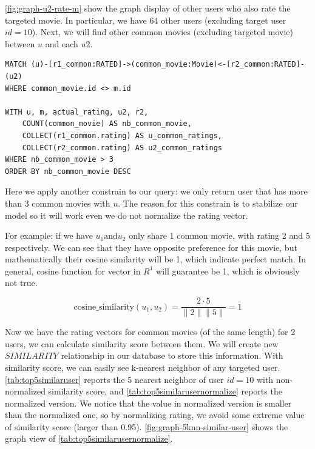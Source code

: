 \documentclass{article}
\begin{document}
\autoref{fig:graph-u2-rate-m} show the graph display of other users who also rate the targeted movie. In particular, we have 64 other users (excluding target user $id=10$). Next, we will find other common movies (excluding targeted movie) between $u$ and each $u2$. 

\begin{verbatim}
MATCH (u)-[r1_common:RATED]->(common_movie:Movie)<-[r2_common:RATED]-(u2)
WHERE common_movie.id <> m.id

WITH u, m, actual_rating, u2, r2,
    COUNT(common_movie) AS nb_common_movie, 
    COLLECT(r1_common.rating) AS u_common_ratings,
    COLLECT(r2_common.rating) AS u2_common_ratings
WHERE nb_common_movie > 3
ORDER BY nb_common_movie DESC
\end{verbatim}

Here we apply another constrain to our query: we only return user that has more than 3 common movies with $u$. The reason for this constrain is to stabilize our model so it will work even we do not normalize the rating vector. 

For example: if we have \(u_1 \text{and} u_2\) only share 1 common movie, with rating 2 and 5 respectively. We can see that they have opposite preference for this movie, but mathematically their cosine similarity will be 1, which indicate perfect match. In general, cosine function for vector in \(R^1\) will guarantee be 1, which is obviously not true.   

\[
\text{cosine\_similarity}(u_1, u_2) =  \frac{2 \cdot 5}{\|2\| \|5\|} = 1
\]

Now we have the rating vectors for common movies (of the same length) for 2 users, we can calculate similarity score between them. We will create new $SIMILARITY$ relationship in our database to store this information. With similarity score, we can easily see k-nearest neighbor of any targeted user. \autoref{tab:top5similaruser} reports the 5 nearest neighbor of user $id = 10$ with non-normalized similarity score, and \autoref{tab:top5similarusernormalize} reports the normalized version. We notice that the value in normalized version is smaller than the normalized one, so by normalizing rating, we avoid some extreme value of similarity score (larger than 0.95). \autoref{fig:graph-5knn-similar-user} shows the graph view of \autoref{tab:top5similarusernormalize}. 
\end{document}
